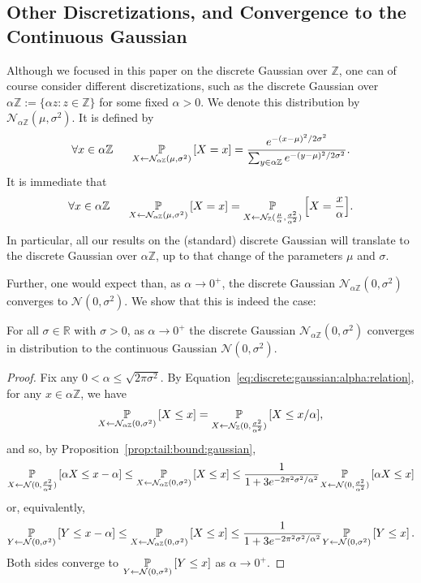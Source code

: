 \documentclass{jpcfinal} %
\newcommand{\discparamN}[1]{\mathcal{N}_{#1\Z}}
\newcommand{\pr}[2]{{\ifx&#1& \mathbb{P} \else
\underset{#1}{\mathbb{P}} \fi \left[#2\right]}}
\newcommand{\Z}{\mathbb{Z}}
\newcommand{\R}{\mathbb{R}}
\begin{document}
\subsection{Other Discretizations, and Convergence to the Continuous Gaussian}
\label{sec:other-discs}
Although we focused in this paper on the discrete Gaussian over $\Z$, one can of course consider different discretizations, such as the discrete Gaussian over $\alpha\Z := \{\alpha z : z \in \Z \}$ for some fixed $\alpha>0$. We denote this distribution by $\discparamN{\alpha}(\mu,\sigma^2)$. It is defined by
\begin{equation}
\forall x \in \alpha\Z ~~~~~ \pr{X \gets \discparamN{\alpha}(\mu,\sigma^2)}{X=x}=\frac{e^{-(x-\mu)^2/2\sigma^2}}{\sum_{y \in \alpha\Z} e^{-(y-\mu)^2/2\sigma^2}}.
\end{equation}
It is immediate that
\begin{equation}\label{eq:discrete:gaussian:alpha:relation}
\forall x \in \alpha\Z ~~~~~ \pr{X \gets \discparamN{\alpha}(\mu,\sigma^2)}{X=x}=\pr{X \gets \discN(\frac{\mu}{\alpha}, \frac{\sigma^2}{\alpha^2})}{X=\frac{x}{\alpha}}.
\end{equation}
 In particular, all our results on the (standard) discrete Gaussian will translate to the discrete Gaussian over $\alpha\Z$, up to that change of the parameters $\mu$ and $\sigma$.
 
 Further, one would expect than, as $\alpha \to 0^+$, the discrete Gaussian $\discparamN{\alpha}(0,\sigma^2)$ converges to $\mathcal{N}(0,\sigma^2)$. We show that this is indeed the case:
 \begin{prop}
    For all $\sigma \in \R$ with $\sigma>0$, as $\alpha \to 0^+$ the discrete Gaussian $\discparamN{\alpha}(0,\sigma^2)$ converges in distribution to the continuous Gaussian $\mathcal{N}(0,\sigma^2)$.
 \end{prop}
 \begin{proof}
 Fix any $0 < \alpha \leq \sqrt{2\pi\sigma^2}$. By Equation~\ref{eq:discrete:gaussian:alpha:relation}, for any $x \in \alpha\Z$, we have
 $$
      \pr{X \gets \discparamN{\alpha}(0,\sigma^2)}{X\leq x}  = \pr{X \gets \discN(0, \frac{\sigma^2}{\alpha^2})}{X\leq x/\alpha }  ,
 $$ and so, by Proposition~\ref{prop:tail:bound:gaussian},
 \[
         \pr{X \gets \mathcal{N}(0,\frac{\sigma^2}{\alpha^2})}{\alpha X \leq x-\alpha} \leq \pr{X \gets \discparamN{\alpha}(0,\sigma^2)}{X\leq x} \leq \frac{1}{1+3e^{-2\pi^2\sigma^2/\alpha^2}}\pr{X \gets \mathcal{N}(0,\frac{\sigma^2}{\alpha^2})}{\alpha X \le x}
 \]
 or, equivalently,
 \[
         \pr{Y \gets \mathcal{N}(0,\sigma^2)}{Y \leq x-\alpha} \leq \pr{X \gets \discparamN{\alpha}(0,\sigma^2)}{X\leq x} \leq \frac{1}{1+3e^{-2\pi^2\sigma^2/\alpha^2}}\pr{Y \gets \mathcal{N}(0,\sigma^2)}{Y \le x}\,.
 \]
 Both sides converge to $\pr{Y \gets \mathcal{N}(0,\sigma^2)}{Y \leq x}$ as $\alpha \to 0^+$. \end{proof}
  
\end{document}

